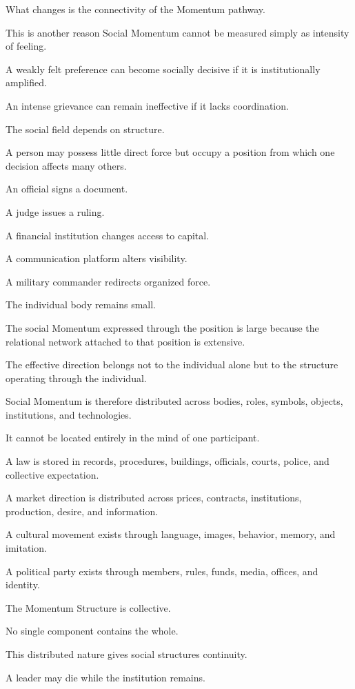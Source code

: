 What changes is the connectivity of the Momentum pathway.

This is another reason Social Momentum cannot be measured simply as intensity of feeling.

A weakly felt preference can become socially decisive if it is institutionally amplified.

An intense grievance can remain ineffective if it lacks coordination.

The social field depends on structure.

A person may possess little direct force but occupy a position from which one decision affects many others.

An official signs a document.

A judge issues a ruling.

A financial institution changes access to capital.

A communication platform alters visibility.

A military commander redirects organized force.

The individual body remains small.

The social Momentum expressed through the position is large because the relational network attached to that position is extensive.

The effective direction belongs not to the individual alone but to the structure operating through the individual.

Social Momentum is therefore distributed across bodies, roles, symbols, objects, institutions, and technologies.

It cannot be located entirely in the mind of one participant.

A law is stored in records, procedures, buildings, officials, courts, police, and collective expectation.

A market direction is distributed across prices, contracts, institutions, production, desire, and information.

A cultural movement exists through language, images, behavior, memory, and imitation.

A political party exists through members, rules, funds, media, offices, and identity.

The Momentum Structure is collective.

No single component contains the whole.

This distributed nature gives social structures continuity.

A leader may die while the institution remains.

